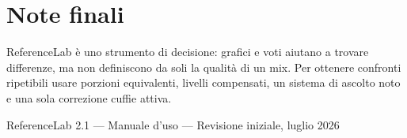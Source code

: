 \documentclass[11pt,a4paper]{article}
\begin{document}
\section{Note finali}

ReferenceLab è uno strumento di decisione: grafici e voti aiutano a trovare
differenze, ma non definiscono da soli la qualità di un mix. Per ottenere
confronti ripetibili usare porzioni equivalenti, livelli compensati, un sistema
di ascolto noto e una sola correzione cuffie attiva.

\vfill
\begin{center}
\small ReferenceLab 2.1 --- Manuale d'uso --- Revisione iniziale, luglio 2026
\end{center}
\end{document}
